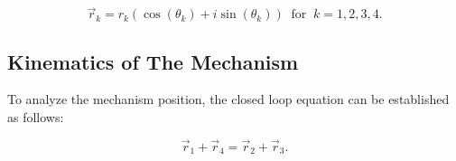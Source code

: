 \documentclass[12pt,letterpape]{article}
\begin{document}
\begin{equation}
	\vec{r}_k = r_k ( \cos(\theta_k) + i \sin( \theta_k ) ) \ \text{ for } \ k = 1,2,3,4.
	\label{eqn:rpolar}
\end{equation}

\subsection{Kinematics of The Mechanism} %
\label{sub:kinematics_of_the_mechanism}

To analyze the mechanism position, the closed loop equation can be established as follows:

\begin{equation}
	\vec{r}_1 + \vec{r}_4 = \vec{r}_2 + \vec{r}_3.
	\label{eqn:sumsr}
\end{equation}
\end{document}
